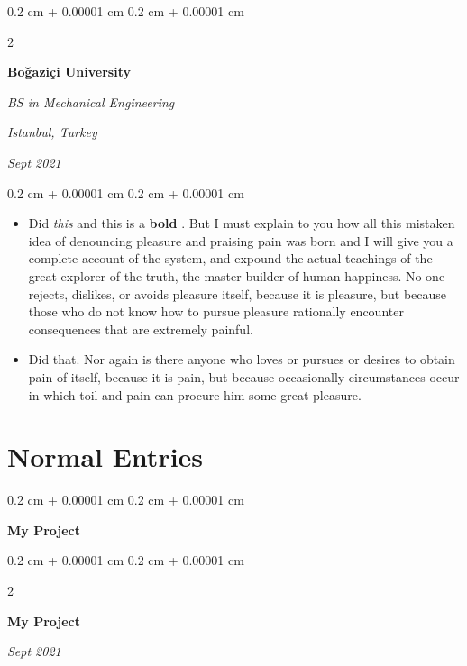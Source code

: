 \documentclass[10pt, letterpaper]{article}
\newenvironment{highlights}{
    \begin{itemize}[
        topsep=0.10 cm,
        parsep=0.10 cm,
        partopsep=0pt,
        itemsep=0pt,
        leftmargin=0.4 cm + 10pt
    ]
}{
    \end{itemize}
} %
\newenvironment{onecolentry}{
    \begin{adjustwidth}{
        0.2 cm + 0.00001 cm
    }{
        0.2 cm + 0.00001 cm
    }
}{
    \end{adjustwidth}
} %
\newenvironment{twocolentry}[2][]{
    \onecolentry
    \def\secondColumn{#2}
    \setcolumnwidth{\fill, 4.5 cm}
    \begin{paracol}{2}
}{
    \switchcolumn \raggedleft \secondColumn
    \end{paracol}
    \endonecolentry
} %
\let\hrefWithoutArrow\href
\renewcommand{\href}[2]{\hrefWithoutArrow{#1}{\ifthenelse{\equal{#2}{}}{ }{#2 }\raisebox{.15ex}{\footnotesize \faExternalLink*}}}
\begin{document}
        \vspace{0.2 cm}

        \begin{twocolentry}{
        \textit{Istanbul, Turkey}    
            
        \textit{Sept 2021}}
            \textbf{Boğaziçi University}

            \textit{BS in Mechanical Engineering}
        \end{twocolentry}

        \vspace{0.10 cm}
        \begin{onecolentry}
            \begin{highlights}
                \item Did \textit{this} and this is a \textbf{bold} \href{https://example.com}{link}. But I must explain to you how all this mistaken idea of denouncing pleasure and praising pain was born and I will give you a complete account of the system, and expound the actual teachings of the great explorer of the truth, the master-builder of human happiness. No one rejects, dislikes, or avoids pleasure itself, because it is pleasure, but because those who do not know how to pursue pleasure rationally encounter consequences that are extremely painful.
                \item Did that. Nor again is there anyone who loves or pursues or desires to obtain pain of itself, because it is pain, but because occasionally circumstances occur in which toil and pain can procure him some great pleasure.
            \end{highlights}
        \end{onecolentry}



    
    \section{Normal Entries}



        
        \begin{onecolentry}
            \textbf{My Project}
        \end{onecolentry}



        \vspace{0.2 cm}

        \begin{twocolentry}{
            
            
        \textit{Sept 2021}}
            \textbf{My Project}
        \end{twocolentry}
\end{document}
